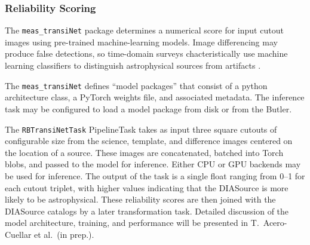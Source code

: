 \subsubsection{Reliability Scoring}
\label{sec:reliability}

The \texttt{meas\_transiNet} package determines a numerical score for input cutout images using pre-trained machine-learning models.
Image differencing may produce false detections, so time-domain surveys chacteristically use machine learning classifiers to distinguish astrophysical sources from artifacts \citep[``Real/Bogus;'' e.g.,][]{2012PASP..124.1175B, 2015AJ....150...82G, 2019MNRAS.489.3582D}.

The \texttt{meas\_transiNet} defines ``model packages'' that consist of a python architecture class, a PyTorch \citep{NEURIPS2019_bdbca288} weights file, and associated metadata.
The inference task may be configured to load a model package from disk or from the Butler.

The \texttt{RBTransiNetTask} PipelineTask takes as input three square cutouts of configurable size from the science, template, and difference images centered on the location of a source.
These images are concatenated, batched into Torch blobs, and passed to the model for inference.
Either CPU or GPU backends may be used for inference.
The output of the task is a single float ranging from 0--1 for each cutout triplet, with higher values indicating that the DIASource is more likely to be astrophysical.
These reliability scores are then joined with the DIASource catalogs by a later transformation task.
Detailed discussion of the model architecture, training, and performance will be presented in T.\ Acero-Cuellar et al.\ (in prep.).
